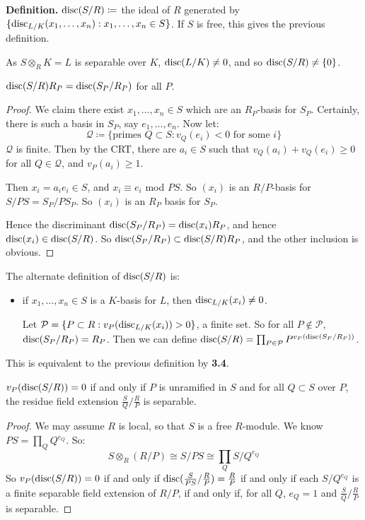\documentclass[10pt,a4paper]{article}
\begin{document}
\textbf{Definition.} $\operatorname{disc}(S/R) \coloneqq$ the ideal of $R$ generated by $\{\operatorname{disc}_{L/K}(x_1, \ldots, x_n) : x_1, \ldots, x_n \in S\}$. If $S$ is free, this gives the previous definition.

As $S \otimes_R K = L$ is separable over $K$, $\operatorname{disc}(L/K) \neq 0$, and so $\operatorname{disc}(S/R) \neq \{0\}$.
\begin{proposition}
  $\operatorname{disc}(S/R) R_P = \operatorname{disc}(S_P/R_P)$ for all $P$.
\end{proposition}
\begin{proof}
  We claim there exist $x_1, \ldots, x_n \in S$ which are an $R_P$-basis for $S_P$. Certainly, there is such a basis in $S_P$, say $e_1, \ldots, e_n$. Now let:
  \[\mathscr{Q} \coloneqq \{\text{primes }Q\subset S : v_Q(e_i) < 0\text{ for some $i$}\}\]
  $\mathscr{Q}$ is finite. Then by the CRT, there are $a_i \in S$ such that $v_Q(a_i) + v_Q(e_i) \geq 0$ for all $Q \in \mathscr{Q}$, and $v_P(a_i) \geq 1$.

  Then $x_i = a_ie_i \in S$, and $x_i\equiv e_i$ mod $PS$. So $(x_i)$ is an $R/P$-basis for $S/PS = S_P/PS_P$. So $(x_i)$ is an $R_P$ basis for $S_P$.

  Hence the discriminant $\operatorname{disc}(S_P/R_P) = \operatorname{disc}(x_i)R_P$, and hence $\operatorname{disc}(x_i) \in \operatorname{disc}(S/R)$. So $\operatorname{disc}(S_P/R_P) \subset \operatorname{disc}(S/R)R_P$, and the other inclusion is obvious.
\end{proof}
The alternate definition of $\operatorname{disc}(S/R)$ is:
\begin{itemize}
  \item if $x_1, \ldots, x_n \in S$ is a $K$-basis for $L$, then $\operatorname{disc}_{L/K}(x_i) \neq 0$.

  Let $\mathcal{P} = \{P \subset R : v_P(\operatorname{disc}_{L/K}(x_i)) > 0\}$, a finite set. So for all $P \notin \mathcal{P}$, $\operatorname{disc}(S_P/R_P) = R_P$. Then we can define $\operatorname{disc}(S/R) = \prod_{P \in \mathcal{P}} P^{v_P(\operatorname{disc}(S_P/R_P))}$.
\end{itemize}
This is equivalent to the previous definition by \textbf{3.4}.
\begin{theorem}
  $v_P(\operatorname{disc}(S/R)) = 0$ if and only if $P$ is unramified in $S$ and for all $Q \subset S$ over $P$, the residue field extension $\frac{S}{Q}/\frac{R}{P}$ is separable.
\end{theorem}
\begin{proof}
  We may assume $R$ is local, so that $S$ is a free $R$-module. We know $PS = \prod_Q Q^{e_Q}$. So:
  \[ S \otimes_R (R/P) \cong S/PS \cong \prod_{Q} S/Q^{e_Q}\]
  So $v_P(\operatorname{disc}(S/R)) = 0$ if and only if $\operatorname{disc}(\frac{S}{PS}/\frac{R}{P}) = \frac{R}{P}$ if and only if each $S/Q^{e_Q}$ is a finite separable field extension of $R/P$, if and only if, for all $Q$, $e_Q = 1$ and $\frac{S}{Q}/\frac{R}{P}$ is separable.
\end{proof}
\end{document}
